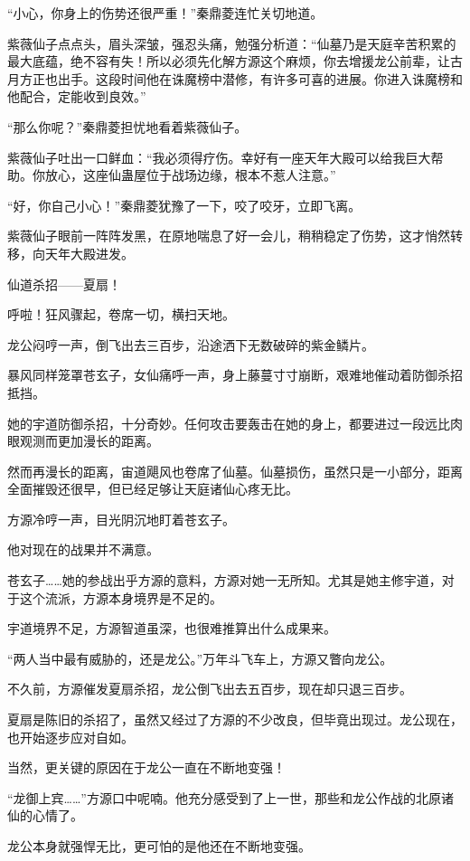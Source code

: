 \begin{this_body}
“小心，你身上的伤势还很严重！”秦鼎菱连忙关切地道。

紫薇仙子点点头，眉头深皱，强忍头痛，勉强分析道：“仙墓乃是天庭辛苦积累的最大底蕴，绝不容有失！所以必须先化解方源这个麻烦，你去增援龙公前辈，让古月方正也出手。这段时间他在诛魔榜中潜修，有许多可喜的进展。你进入诛魔榜和他配合，定能收到良效。”

“那么你呢？”秦鼎菱担忧地看着紫薇仙子。

紫薇仙子吐出一口鲜血：“我必须得疗伤。幸好有一座天年大殿可以给我巨大帮助。你放心，这座仙蛊屋位于战场边缘，根本不惹人注意。”

“好，你自己小心！”秦鼎菱犹豫了一下，咬了咬牙，立即飞离。

紫薇仙子眼前一阵阵发黑，在原地喘息了好一会儿，稍稍稳定了伤势，这才悄然转移，向天年大殿进发。

仙道杀招——夏扇！

呼啦！狂风骤起，卷席一切，横扫天地。

龙公闷哼一声，倒飞出去三百步，沿途洒下无数破碎的紫金鳞片。

暴风同样笼罩苍玄子，女仙痛呼一声，身上藤蔓寸寸崩断，艰难地催动着防御杀招抵挡。

她的宇道防御杀招，十分奇妙。任何攻击要轰击在她的身上，都要进过一段远比肉眼观测而更加漫长的距离。

然而再漫长的距离，宙道飓风也卷席了仙墓。仙墓损伤，虽然只是一小部分，距离全面摧毁还很早，但已经足够让天庭诸仙心疼无比。

方源冷哼一声，目光阴沉地盯着苍玄子。

他对现在的战果并不满意。

苍玄子……她的参战出乎方源的意料，方源对她一无所知。尤其是她主修宇道，对于这个流派，方源本身境界是不足的。

宇道境界不足，方源智道虽深，也很难推算出什么成果来。

“两人当中最有威胁的，还是龙公。”万年斗飞车上，方源又瞥向龙公。

不久前，方源催发夏扇杀招，龙公倒飞出去五百步，现在却只退三百步。

夏扇是陈旧的杀招了，虽然又经过了方源的不少改良，但毕竟出现过。龙公现在，也开始逐步应对自如。

当然，更关键的原因在于龙公一直在不断地变强！

“龙御上宾……”方源口中呢喃。他充分感受到了上一世，那些和龙公作战的北原诸仙的心情了。

龙公本身就强悍无比，更可怕的是他还在不断地变强。


\end{this_body}
